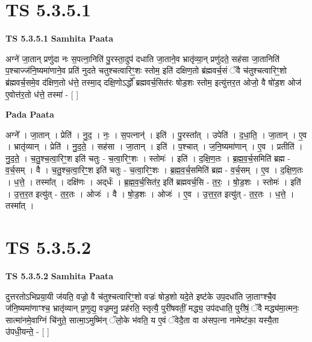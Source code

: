 \documentclass[17pt]{extarticle}
\begin{document}

\section{ TS 5.3.5.1 }

\textbf{TS 5.3.5.1 } \newline
\textbf{Samhita Paata} \newline

अग्ने॑ जा॒तान् प्रणु॑दा नः स॒पत्ना॒निति॑ पु॒रस्ता॒दुप॑ दधाति जा॒ताने॒व भ्रातृ॑व्या॒न् प्रणु॑दते॒ सह॑सा जा॒तानिति॑ प॒श्चाज्ज॑नि॒ष्यमा॑णाने॒व प्रति॑ नुदते चतुश्चत्वारिꣳ॒॒शः स्तोम॒ इति॑ दक्षिण॒तो ब्र॑ह्मवर्च॒सं ॅवै च॑तुश्चत्वारिꣳ॒॒शो ब्र॑ह्मवर्च॒समे॒व द॑क्षिण॒तो ध॑त्ते॒ तस्मा॒द् दक्षि॒णोऽर्द्धो᳚ ब्रह्मवर्च॒सित॑रः षोड॒शः स्तोम॒ इत्यु॑त्तर॒त ओजो॒ वै षो॑ड॒श ओज॑ ए॒वोत्त॑र॒तो ध॑त्ते॒ तस्मा॑ - [  ] \newline

\textbf{Pada Paata} \newline

अग्ने᳚ । जा॒तान् । प्रेति॑ । नु॒द॒ । नः॒ । स॒पत्नान्॑ । इति॑ । पु॒रस्ता᳚त् । उपेति॑ । द॒धा॒ति॒ । जा॒तान् । ए॒व । भ्रातृ॑व्यान् । प्रेति॑ । नु॒द॒ते॒ । सह॑सा । जा॒तान् । इति॑ । प॒श्चात् । ज॒नि॒ष्यमा॑णान् । ए॒व । प्रतीति॑ । नु॒द॒ते॒ । च॒तु॒श्च॒त्वा॒रिꣳ॒॒श इति॑ चतुः - च॒त्वा॒रिꣳ॒॒शः । स्तोमः॑ । इति॑ । द॒क्षि॒ण॒तः । ब्र॒ह्म॒व॒र्च॒समिति॑ ब्रह्म - व॒र्च॒सम् । वै । च॒तु॒श्च॒त्वा॒रिꣳ॒॒श इति॑ चतुः - च॒त्वा॒रिꣳ॒॒शः । ब्र॒ह्म॒व॒र्च॒समिति॑ ब्रह्म - व॒र्च॒सम् । ए॒व । द॒क्षि॒ण॒तः । ध॒त्ते॒ । तस्मा᳚त् । दक्षि॑णः । अद्‌र्धः॑ । ब्र॒ह्म॒व॒र्च॒सित॑र॒ इति॑ ब्रह्मवर्च॒सि - त॒रः॒ । षो॒ड॒शः । स्तोमः॑ । इति॑ । उ॒त्त॒र॒त इत्यु॑त् - त॒र॒तः । ओजः॑ । वै । षो॒ड॒शः । ओजः॑ । ए॒व । उ॒त्त॒र॒त इत्यु॑त् - त॒र॒तः । ध॒त्ते॒ । तस्मा᳚त् ।  \newline





\section{ TS 5.3.5.2 }

\textbf{TS 5.3.5.2 } \newline
\textbf{Samhita Paata} \newline

दुत्तरतोऽभिप्रया॒यी ज॑यति॒ वज्रो॒ वै च॑तुश्चत्वारिꣳ॒॒शो वज्रः॑ षोड॒शो यदे॒ते इष्ट॑के उप॒दधा॑ति जा॒ताꣳश्चै॒व ज॑नि॒ष्यमा॑णाꣳश्च॒ भ्रातृ॑व्यान् प्र॒णुद्य॒ वज्र॒मनु॒ प्रह॑रति॒ स्तृत्यै॒ पुरी॑षवतीं॒ मद्ध्य॒ उप॑दधाति॒ पुरी॑षं॒ ॅवै मद्ध्य॑मा॒त्मनः॒ सात्मा॑नमे॒वाग्निं चि॑नुते॒ सात्मा॒ऽमुष्मि॑न् ॅलो॒के भ॑वति॒ य ए॒वं ॅवेदै॒ता वा अ॑सप॒त्ना नामेष्ट॑का॒ यस्यै॒ता उ॑पधी॒यन्ते॒ - [  ] \newline
\end{document}

